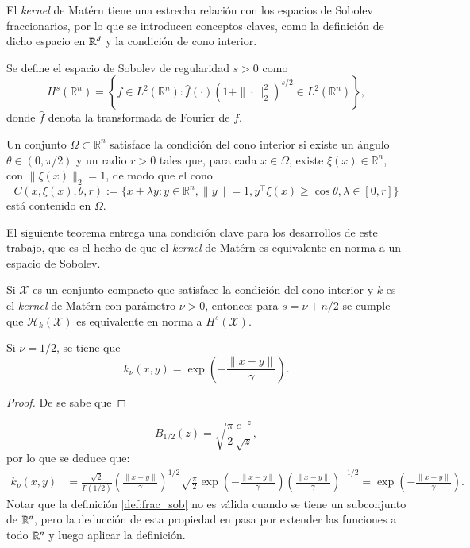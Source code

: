 El \textit{kernel} de Matérn tiene una estrecha relación con los espacios de Sobolev fraccionarios, por lo que se introducen conceptos claves, como la definición de dicho espacio en $\mathbb{R}^d$ y la condición de cono interior.

\begin{defn} Se define el espacio de Sobolev de regularidad $s > 0$ como
\[
H^s(\mathbb{R}^n) = \left\{ f \in L^2(\mathbb{R}^n) : \widehat{f}(\cdot)(1 + \|\cdot\|_2^2)^{s/2} \in L^2(\mathbb{R}^n) \right\},
\]
donde \( \widehat{f} \) denota la transformada de Fourier de \( f \).
\label{def:frac_sob}
\end{defn}

\begin{defn}
Un conjunto \( \Omega \subset \mathbb{R}^n \) satisface la condición del cono interior si existe un ángulo \( \theta \in (0, \pi/2) \) y un radio \( r > 0 \) tales que, para cada \( x \in \Omega \), existe \( \xi(x) \in \mathbb{R}^n \), con \( \|\xi(x)\|_2 = 1 \), de modo que el cono
\[
C(x, \xi(x), \theta, r) := \{x + \lambda y : y \in \mathbb{R}^n, \|y\| = 1, y^\top \xi(x) \geq \cos \theta, \lambda \in [0, r]\}
\]
está contenido en \( \Omega \).
\end{defn}
El siguiente teorema entrega una condición clave para los desarrollos de este trabajo, que es el hecho de que el \textit{kernel} de Matérn es equivalente en norma a un espacio de Sobolev.
\begin{teo}
Si \( \mathcal{X} \) es un conjunto compacto que satisface la condición del cono interior y \( k \) es el \textit{kernel} de Matérn con parámetro \( \nu > 0 \), entonces para \( s = \nu + n/2 \) se cumple que \( \mathcal{H}_k (\mathcal{X}) \) es equivalente en norma a \( H^s (\mathcal{X}) \).
\end{teo}

\begin{prop}
    Si $\nu = 1/2$, se tiene que
    \[
    k_\nu (x, y) = \exp \left( -\frac{\|x-y\|}{\gamma} \right).
    \]
\end{prop}

\begin{proof}
    De \cite{Barton1965HandbookTables., Davis1944AFunctions} se sabe que
\end{proof}
    \[
B_{1/2} (z) = \sqrt{ \frac{\pi}{2} } \frac{e^{-z}}{\sqrt{z}},
\]
por lo que se deduce que:
\[
\begin{aligned}
k_\nu (x,y) &= \frac{\sqrt{2}}{\Gamma(1/2)} \left(  \frac{\|x-y\|}{\gamma} \right)^{1/2} \sqrt{ \frac{\pi}{2} } \exp \left( -\frac{\|x-y\|}{\gamma} \right) \left(  \frac{\|x-y\|}{\gamma} \right)^{-1/2} = \exp \left( -\frac{\|x-y\|}{\gamma} \right).
\end{aligned}
\]
Notar que la definición \ref{def:frac_sob} no es válida cuando se tiene un subconjunto de $\mathbb{R}^n$, pero la deducción de esta propiedad en \cite{Wendland2004ScatteredApproximation} pasa por extender las funciones a todo $\mathbb{R}^n$ y luego aplicar la definición. 

